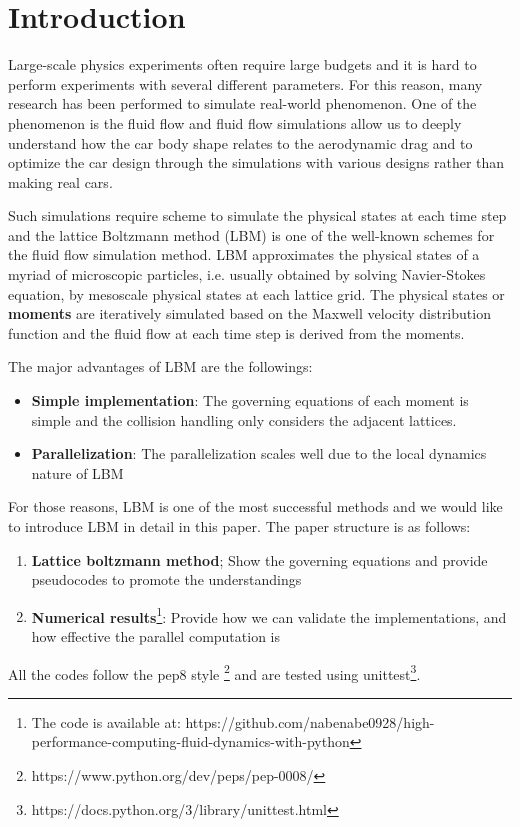 \chapter{Introduction}
\vspace{-5mm}
Large-scale physics experiments often require large budgets
and it is hard to perform experiments with several different parameters.
For this reason, many research has been performed to simulate real-world 
phenomenon.
One of the phenomenon is the fluid flow
and fluid flow simulations allow us to deeply understand
how the car body shape relates to the aerodynamic drag
and to optimize the car design through the simulations with
various designs rather than making real cars\cite{}.

Such simulations require scheme to simulate the physical states
at each time step
and the lattice Boltzmann method (LBM) \cite{} is one of the well-known
schemes for the fluid flow simulation method.
LBM approximates the physical states of a myriad of microscopic particles,
i.e. usually obtained by solving Navier-Stokes equation,
by mesoscale physical states at each lattice grid.
The physical states or {\bf moments} are iteratively simulated based on
the Maxwell velocity distribution function\cite{} and
the fluid flow at each time step is derived from the moments.

The major advantages of LBM are the followings:
\begin{itemize}
  \item {\bf Simple implementation}: The governing equations of each moment
  is simple and the collision handling only considers the adjacent lattices. 
  \item {\bf Parallelization}: The parallelization scales well due to
  the local dynamics nature of LBM\cite{}
\end{itemize}
For those reasons, LBM is one of the most successful methods and
we would like to introduce LBM in detail in this paper.
The paper structure is as follows:
\begin{enumerate}
  \item {\bf Lattice boltzmann method}; Show the governing equations and 
  provide pseudocodes to promote the understandings
  \item {\bf Numerical results}\footnote{
  The code is available at:
    https://github.com/nabenabe0928/high-performance-computing-fluid-dynamics-with-python
  }: Provide how we can validate the implementations,
  and how effective the parallel computation is
\end{enumerate}
All the codes follow the pep8 style
\footnote{https://www.python.org/dev/peps/pep-0008/} and 
are tested using
unittest\footnote{https://docs.python.org/3/library/unittest.html}.
